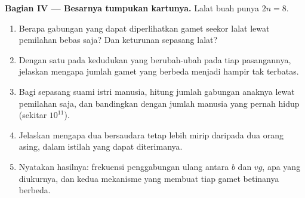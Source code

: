 \begin{problem}
\medskip
\noindent\textbf{Bagian IV --- Besarnya tumpukan kartunya.}
Lalat buah punya $2n = 8$.
\begin{enumerate}[resume]
  \item Berapa gabungan  yang dapat diperlihatkan gamet seekor
        lalat lewat pemilahan bebas saja? Dan keturunan sepasang lalat?
  \item Dengan satu  pada kedudukan yang berubah-ubah pada
        tiap pasangannya, jelaskan mengapa jumlah gamet yang berbeda
        menjadi hampir tak terbatas.
  \item Bagi sepasang suami istri manusia, hitung jumlah gabungan
         anaknya lewat pemilahan saja, dan bandingkan dengan
        jumlah manusia yang pernah hidup (sekitar $10^{11}$).
  \item Jelaskan mengapa dua bersaudara tetap lebih mirip daripada dua
        orang asing, dalam istilah  yang dapat diterimanya.
  \item Nyatakan hasilnya: frekuensi penggabungan ulang antara $b$ dan
        $vg$, apa yang diukurnya, dan kedua mekanisme  yang
        membuat tiap gamet betinanya berbeda.
\end{enumerate}
\end{problem}
